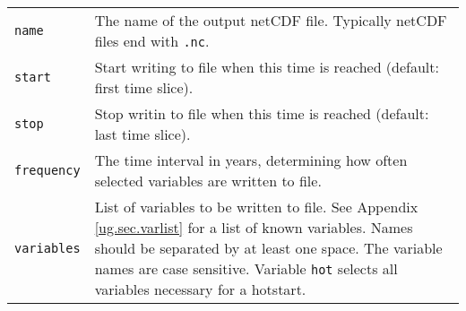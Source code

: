 \begin{center}
\begin{supertabular*}{\textwidth}{@{\extracolsep{\fill}}|l|p{11cm}|}
    \hline
    \texttt{name} & The name of the output netCDF file. Typically netCDF files end with \texttt{.nc}.\\
    \texttt{start} & Start writing to file when this time is reached (default: first time slice).\\
    \texttt{stop} & Stop writin to file when this time is reached (default: last time slice). \\
    \texttt{frequency} & The time interval in years, determining how often selected variables are written to file.\\
    \texttt{variables} & List of variables to be written to file. See Appendix \ref{ug.sec.varlist} for a list of known variables. Names should be separated by at least one space. The variable names are case sensitive. Variable \texttt{hot} selects all variables necessary for a hotstart.\\
    \hline
  \end{supertabular*}
\end{center}

